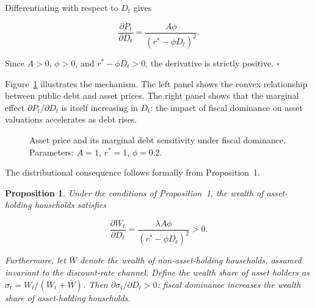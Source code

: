 \documentclass[3p]{elsarticle}
\newtheorem{proposition}{Proposition}
\begin{document}
Differentiating with respect to $D_t$ gives

\[
\frac{\partial P_t}{\partial D_t}
=
\frac{A\phi}{(r^{*}-\phi D_t)^2}.
\]

Since $A>0$, $\phi>0$, and $r^{*}-\phi D_t>0$, the derivative is strictly positive.
\hfill $\square$

\medskip

Figure~\ref{fig:mechanism} illustrates the mechanism. The left panel shows the convex
relationship between public debt and asset prices. The right panel shows that the marginal
effect $\partial P_t / \partial D_t$ is itself increasing in $D_t$: the impact of fiscal
dominance on asset valuations accelerates as debt rises.

\begin{figure}[ht]
\centering
{}
\hfill
{}
\caption{Asset price and its marginal debt sensitivity under fiscal dominance.
Parameters: $A=1$, $r^{*}=1$, $\phi=0.2$.}
\label{fig:mechanism}
\end{figure}

The distributional consequence follows formally from Proposition~1.

\begin{proposition}
Under the conditions of Proposition~1, the wealth of asset-holding households satisfies

\[
\frac{\partial W_t}{\partial D_t}
=
\frac{\lambda A\phi}{(r^{*}-\phi D_t)^2} > 0.
\]

Furthermore, let $\bar{W}$ denote the wealth of non-asset-holding households, assumed
invariant to the discount-rate channel. Define the wealth share of asset holders as
$\sigma_t = W_t/(W_t + \bar{W})$. Then $\partial \sigma_t / \partial D_t > 0$: fiscal
dominance increases the wealth share of asset-holding households.
\end{proposition}
\end{document}
